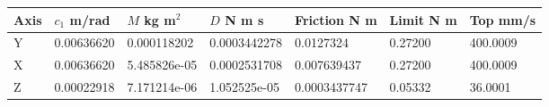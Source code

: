 \begin{tabular}{lllllll}
\toprule
Axis & $c_1$ m/rad & $M$ kg m$^2$ & $D$ N m s & Friction N m & Limit N m & Top mm/s \\
\midrule
Y & 0.00636620 & 0.000118202 & 0.0003442278 & 0.0127324 & 0.27200 & 400.0009 \\
X & 0.00636620 & 5.485826e-05 & 0.0002531708 & 0.007639437 & 0.27200 & 400.0009 \\
Z & 0.00022918 & 7.171214e-06 & 1.052525e-05 & 0.0003437747 & 0.05332 & 36.0001 \\
\bottomrule
\end{tabular}

